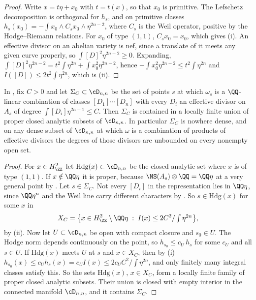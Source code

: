 \begin{proof}
Write $x=t\eta+x_{0}$ with $t=t(x)$, so that $x_{0}$ is primitive. The
Lefschetz decomposition is orthogonal for $h_{s}$, and on primitive classes
$h_{s}(x_{0})=-\int x_{0}\wedge C_{s}x_{0}\wedge\eta^{2n-2}$, where $C_{s}$ is
the Weil operator, positive by the Hodge--Riemann relations. For $x_{0}$ of type
$(1,1)$, $C_{s}x_{0}=x_{0}$, which gives (i). An effective divisor on an
abelian variety is nef, since a translate of it meets any given curve
properly, so $\int[D]^{2}\eta^{2n-2}\ge0$. Expanding,
$\int[D]^{2}\eta^{2n-2}=t^{2}\int\eta^{2n}+\int x_{0}^{2}\eta^{2n-2}$, hence
$-\int x_{0}^{2}\eta^{2n-2}\le t^{2}\int\eta^{2n}$ and
$I([D])\le2t^{2}\int\eta^{2n}$, which is (ii).
\end{proof}

\begin{proposition}\label{prop:divroute}
In , fix $C>0$ and let $\Sigma_{C}\subset\cD_{n,n}$ be the
set of points $s$ at which $\omega_{s}$ is a $\QQ$-linear combination of
classes $[D_{1}]\cdots[D_{n}]$ with every $D_{i}$ an effective divisor on
$A_{s}$ of degree $\int[D_{i}]\eta^{2n-1}\le C$. Then $\Sigma_{C}$ is
contained in a locally finite union of proper closed analytic subsets of
$\cD_{n,n}$. In particular $\Sigma_{C}$ is nowhere dense, and on any dense
subset of $\cD_{n,n}$ at which $\omega$ is a combination of products of
effective divisors the degrees of those divisors are unbounded on every
nonempty open set.
\end{proposition}

\begin{proof}
For $x\in H^{2}_{\ZZ}$ let $\mathrm{Hdg}(x)\subset\cD_{n,n}$ be the
closed analytic set where $x$ is of type $(1,1)$. If $x\notin\QQ\eta$ it is
proper, because $\NS(A_{s})\otimes\QQ=\QQ\eta$ at a very general point by
. Let $s\in\Sigma_{C}$. Not every $[D_{i}]$ in the
representation lies in $\QQ\eta$, since $\QQ\eta^{n}$ and the Weil line carry
different characters by . So $s\in\mathrm{Hdg}(x)$ for
some $x$ in
\[
  X_{C}=\bigl\{x\in H^{2}_{\ZZ}\setminus\QQ\eta\;:\;
  I(x)\le 2C^{2}/\textstyle\int\eta^{2n}\bigr\},
\]
by (ii). Now let $U\subset\cD_{n,n}$ be open with compact
closure and $s_{0}\in U$. The Hodge norm depends continuously on the point, so
$h_{s_{0}}\le c_{U}\,h_{s}$ for some $c_{U}$ and all $s\in U$. If
$\mathrm{Hdg}(x)$ meets $U$ at $s$ and $x\in X_{C}$, then by
(i)
$h_{s_{0}}(x)\le c_{U}h_{s}(x)=c_{U}I(x)\le 2c_{U}C^{2}/\int\eta^{2n}$, and
only finitely many integral classes satisfy this. So the sets
$\mathrm{Hdg}(x)$, $x\in X_{C}$, form a locally finite family of proper closed
analytic subsets. Their union is closed with empty interior in the connected
manifold $\cD_{n,n}$, and it contains $\Sigma_{C}$.
\end{proof}

